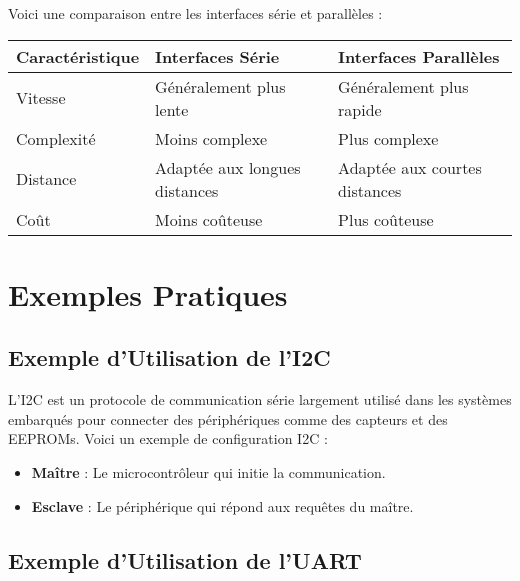 \documentclass[10pt,a4paper]{article}
\begin{document}
Voici une comparaison entre les interfaces série et parallèles :

\begin{center}
    \begin{tabular}{|l|l|l|}
    \hline
    \textbf{Caractéristique} & \textbf{Interfaces Série} & \textbf{Interfaces Parallèles} \\
    \hline
    Vitesse & Généralement plus lente & Généralement plus rapide \\
    Complexité & Moins complexe & Plus complexe \\
    Distance & Adaptée aux longues distances & Adaptée aux courtes distances \\
    Coût & Moins coûteuse & Plus coûteuse \\
    \hline
    \end{tabular}
\end{center}


\section*{Exemples Pratiques}

\subsection*{Exemple d'Utilisation de l'I2C}

L'I2C est un protocole de communication série largement utilisé dans les systèmes embarqués pour connecter des périphériques comme des capteurs et des EEPROMs. Voici un exemple de configuration I2C :
\begin{itemize}
    \item \textbf{Maître} : Le microcontrôleur qui initie la communication.
    \item \textbf{Esclave} : Le périphérique qui répond aux requêtes du maître.
\end{itemize}


\subsection*{Exemple d'Utilisation de l'UART}
\end{document}
